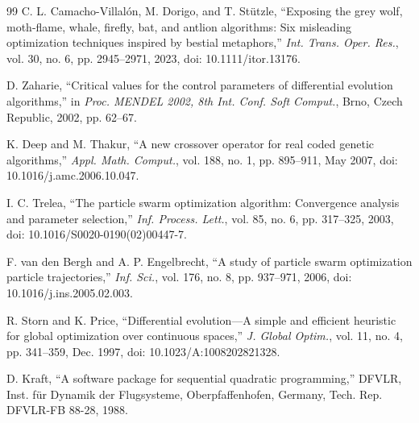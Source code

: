 {\begin{thebibliography}{99}
C. L. Camacho-Villal\'on, M. Dorigo, and T. St\"utzle, ``Exposing the grey wolf, moth-flame, whale, firefly, bat, and antlion algorithms: Six misleading optimization techniques inspired by bestial metaphors,'' \textit{Int. Trans. Oper. Res.}, vol. 30, no. 6, pp. 2945--2971, 2023, doi: 10.1111/itor.13176.

D. Zaharie, ``Critical values for the control parameters of differential evolution algorithms,'' in \textit{Proc. MENDEL 2002, 8th Int. Conf. Soft Comput.}, Brno, Czech Republic, 2002, pp. 62--67.

K. Deep and M. Thakur, ``A new crossover operator for real coded genetic algorithms,'' \textit{Appl. Math. Comput.}, vol. 188, no. 1, pp. 895--911, May 2007, doi: 10.1016/j.amc.2006.10.047.

I. C. Trelea, ``The particle swarm optimization algorithm: Convergence analysis and parameter selection,'' \textit{Inf. Process. Lett.}, vol. 85, no. 6, pp. 317--325, 2003, doi: 10.1016/S0020-0190(02)00447-7.

F. van den Bergh and A. P. Engelbrecht, ``A study of particle swarm optimization particle trajectories,'' \textit{Inf. Sci.}, vol. 176, no. 8, pp. 937--971, 2006, doi: 10.1016/j.ins.2005.02.003.

R. Storn and K. Price, ``Differential evolution---A simple and efficient heuristic for global optimization over continuous spaces,'' \textit{J. Global Optim.}, vol. 11, no. 4, pp. 341--359, Dec. 1997, doi: 10.1023/A:1008202821328.

D. Kraft, ``A software package for sequential quadratic programming,'' DFVLR, Inst. f\"ur Dynamik der Flugsysteme, Oberpfaffenhofen, Germany, Tech. Rep. DFVLR-FB 88-28, 1988.


\end{thebibliography}}
